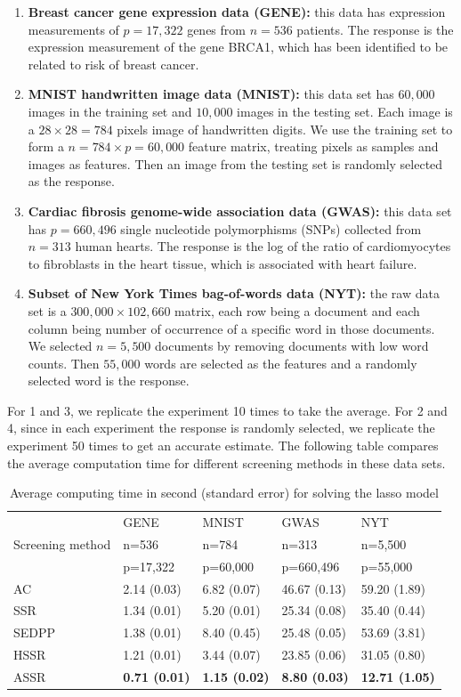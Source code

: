 \documentclass{article}
\begin{document}
\begin{enumerate}
    \item \textbf{Breast cancer gene expression data
(GENE):} this data has expression measurements of $p=17,322$ genes from $n=536$ patients. The response is the expression measurement of the gene BRCA1, which has been identified to be related to risk of breast cancer.
    \item \textbf{MNIST handwritten image data
(MNIST):} this data set has $60,000$ images in the training set and $10,000$ images in the testing set. Each image is a $28\times 28=784$ pixels image of handwritten digits. We use the training set to form a $n=784\times p=60,000$ feature matrix, treating pixels as samples and images as features. Then an image from the testing set is randomly selected as the response.
    \item \textbf{ Cardiac fibrosis genome-wide association data
(GWAS):} this data set has $p=660,496$ single nucleotide
polymorphisms (SNPs) collected from $n=313$ human hearts. The response is the log of the ratio of cardiomyocytes to fibroblasts in the heart tissue, which is associated with heart failure.
    \item \textbf{Subset of New York Times bag-of-words data
(NYT):} the raw data set is a $300,000\times 102,660$ matrix, each row being a document and each column being number of occurrence of a specific word in those documents. We selected $n=5,500$ documents by removing documents with low word counts. Then $55,000$ words are selected as the features and a randomly selected word is the response.

\end{enumerate}


For 1 and 3, we replicate the experiment 10 times to take the average. For 2 and 4, since in each experiment the response is randomly selected, we replicate the experiment 50 times to get an accurate estimate. The following table compares the average computation time for different screening methods in these data sets.

\begin{table}[H]
\centering
\begin{tabular}{l|l|l|l|l}
\hline
 & GENE & MNIST & GWAS & NYT \\
Screening method & n=536 & n=784 & n=313 & n=5,500 \\
 & p=17,322 & p=60,000 & p=660,496 & p=55,000 \\ \hline
AC & 2.14 (0.03) & 6.82 (0.07) & 46.67 (0.13) & 59.20 (1.89) \\
SSR & 1.34 (0.01) & 5.20 (0.01) & 25.34 (0.08) & 35.40 (0.44) \\
SEDPP & 1.38 (0.01) & 8.40 (0.45) & 25.48 (0.05) & 53.69 (3.81) \\
HSSR & 1.21 (0.01) & 3.44 (0.07) & 23.85 (0.06) & 31.05 (0.80) \\
ASSR & \textbf{0.71 (0.01)} & \textbf{1.15 (0.02)} & \textbf{8.80 (0.03)} & \textbf{12.71 (1.05)} \\\hline
\end{tabular}
\caption{Average computing time in second (standard error) for solving the lasso model}
\end{table}
\end{document}
